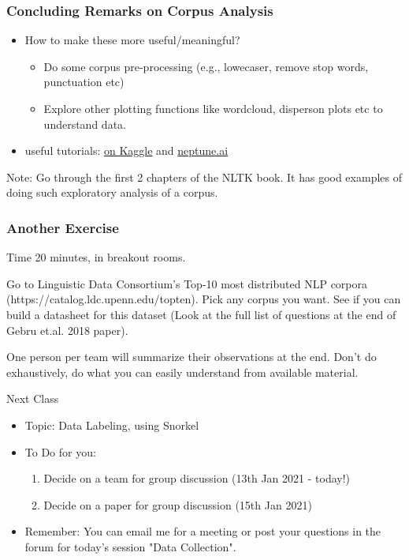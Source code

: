 \documentclass{beamer}
\begin{document}

\begin{frame}
\frametitle{Concluding Remarks on Corpus Analysis}
\begin{itemize}
\item How to make these more useful/meaningful? 
\begin{itemize}
\item Do some corpus pre-processing (e.g., lowecaser, remove stop words, punctuation etc)
\item Explore other plotting functions like wordcloud, disperson plots etc to understand data. 
\end{itemize}
\item useful tutorials: \href{https://www.kaggle.com/wil2210/eda-nlp-ml}{on Kaggle} and \href{https://neptune.ai/blog/exploratory-data-analysis-natural-language-processing-tools}{neptune.ai}
\end{itemize}
Note: Go through the first 2 chapters of the NLTK book. It has good examples of doing such exploratory analysis of a corpus. 
\end{frame}

\begin{frame}
\frametitle{Another Exercise}
Time 20 minutes, in breakout rooms.

Go to Linguistic Data Consortium's Top-10 most distributed NLP corpora (https://catalog.ldc.upenn.edu/topten). Pick any corpus you want. See if you can build a datasheet for this dataset (Look at the full list of questions at the end of Gebru et.al. 2018 paper). 

One person per team will summarize their observations at the end. Don't do exhaustively, do what you can easily understand from available material. 
\end{frame}

\begin{frame}{Next Class}
    \begin{itemize}
    \item Topic: Data Labeling, using Snorkel
    \item To Do for you: 
    \begin{enumerate}
        \item Decide on a team for group discussion (13th Jan 2021 - today!)
       \item Decide on a paper for group discussion (15th Jan 2021)
      \end{enumerate}
      \item Remember: You can email me for a meeting or post your questions in the forum for today's session "Data Collection".
    \end{itemize}
\end{frame}
\end{document}
